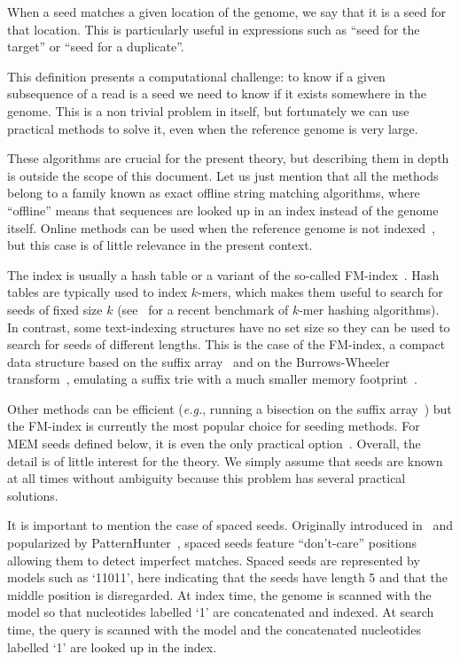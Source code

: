 \documentclass{article}
\begin{document}
When a seed matches a given location of the genome, we say that it is a
seed for that location. This is particularly useful in expressions such as
``seed for the target'' or ``seed for a duplicate''.

This definition presents a computational challenge: to know if a given
subsequence of a read is a seed we need to know if it exists somewhere in
the genome. This is a non trivial problem in itself, but fortunately we
can use practical methods to solve it, even when the reference genome is
very large.

These algorithms are crucial for the present theory, but describing them
in depth is outside the scope of this document. Let us just mention that
all the methods belong to a family known as exact offline string matching
algorithms, where ``offline'' means that sequences are looked up in an
index instead of the genome itself. Online methods can be used when the
reference genome is not indexed~\cite{faro2013exact}, but this case is of
little relevance in the present context.

The index is usually a hash table or a variant of the so-called
FM-index~\cite{ferragina2000opportunistic, ferragina2005indexing}. Hash
tables are typically used to index $k$-mers, which makes them useful to
search for seeds of fixed size $k$ (see~\cite{pmid30346548} for a recent
benchmark of $k$-mer hashing algorithms). In contrast, some text-indexing
structures have no set size so they can be used to search for seeds of
different lengths. This is the case of the FM-index, a compact data
structure based on the suffix array~\cite{manber1993suffix} and on the
Burrows-Wheeler transform~\cite{burrows1994block}, emulating a suffix trie
with a much smaller memory footprint~\cite{ferragina2000opportunistic,
ferragina2005indexing}.

Other methods can be efficient (\textit{e.g.}, running a bisection on the
suffix array~\cite{dobin2013star}) but the FM-index is currently the most
popular choice for seeding methods. For MEM seeds defined below, it is
even the only practical option~\cite{pmid24336412, pmid25399029,
pmid23349213, pmid19389736}. Overall, the detail is of little interest for
the theory. We simply assume that seeds are known at all times without
ambiguity because this problem has several practical solutions.

It is important to mention the case of spaced seeds. Originally introduced
in~\cite{califano1993flash} and popularized by
PatternHunter~\cite{pmid11934743}, spaced seeds feature ``don't-care''
positions allowing them to detect imperfect matches. Spaced seeds are
represented by models such as `11011', here indicating that the seeds have
length 5 and that the middle position is disregarded. At index time, the
genome is scanned with the model so that nucleotides labelled `1' are
concatenated and indexed. At search time, the query is scanned with the
model and the concatenated nucleotides labelled `1' are looked up in the
index.
\end{document}
